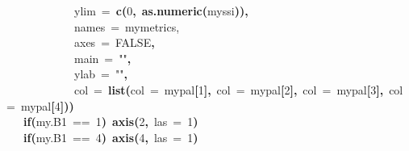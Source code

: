 \documentclass{article}
\makeatletter
\newcommand{\hlnumber}[1]{\textcolor[rgb]{0,0,0}{#1}}%
\newcommand{\hlfunctioncall}[1]{\textcolor[rgb]{0.501960784313725,0,0.329411764705882}{\textbf{#1}}}%
\newcommand{\hlstring}[1]{\textcolor[rgb]{0.6,0.6,1}{#1}}%
\newcommand{\hlkeyword}[1]{\textcolor[rgb]{0,0,0}{\textbf{#1}}}%
\newcommand{\hlargument}[1]{\textcolor[rgb]{0.690196078431373,0.250980392156863,0.0196078431372549}{#1}}%
\newcommand{\hlcomment}[1]{\textcolor[rgb]{0.180392156862745,0.6,0.341176470588235}{#1}}%
\newcommand{\hlsymbol}[1]{\textcolor[rgb]{0,0,0}{#1}}%
\newcommand{\hlstd}[1]{\textcolor[rgb]{0,0,0}{#1}}%
\newenvironment{kframe}{%
 \def\FrameCommand##1{\hskip\@totalleftmargin \hskip-\fboxsep
 \colorbox{shadecolor}{##1}\hskip-\fboxsep
     \hskip-\linewidth \hskip-\@totalleftmargin \hskip\columnwidth}%
 \MakeFramed {\advance\hsize-\width
   \@totalleftmargin\z@ \linewidth\hsize
   \@setminipage}}%
 {\par\unskip\endMakeFramed}
\newenvironment{knitrout}{}{} %
\makeatother
\begin{document}
\begin{knitrout}
\begin{kframe}
\begin{flushleft}
\hlstd{}{\ }{\ }{\ }{\ }{\ }{\ }{\ }{\ }{\ }{\ }{\ }{\ }{\ }\hlargument{ylim}{\ }\hlargument{=}{\ }\hlfunctioncall{c}\hlkeyword{(}\hlnumber{0}\hlkeyword{,}{\ }\hlfunctioncall{as.numeric}\hlkeyword{(}\hlsymbol{myssi}\hlkeyword{)}\hlkeyword{)}\hlkeyword{,}\hspace*{\fill}\\
\hlstd{}{\ }{\ }{\ }{\ }{\ }{\ }{\ }{\ }{\ }{\ }{\ }{\ }{\ }\hlcomment{\usebox{\hlnormalsizeboxhash}names{\ }={\ }mymetrics,}\hspace*{\fill}\\
\hlstd{}{\ }{\ }{\ }{\ }{\ }{\ }{\ }{\ }{\ }{\ }{\ }{\ }{\ }\hlargument{axes}{\ }\hlargument{=}{\ }\hlnumber{FALSE}\hlkeyword{,}\hspace*{\fill}\\
\hlstd{}{\ }{\ }{\ }{\ }{\ }{\ }{\ }{\ }{\ }{\ }{\ }{\ }{\ }\hlargument{main}{\ }\hlargument{=}{\ }\hlstring{"{}"{}}\hlkeyword{,}\hspace*{\fill}\\
\hlstd{}{\ }{\ }{\ }{\ }{\ }{\ }{\ }{\ }{\ }{\ }{\ }{\ }{\ }\hlargument{ylab}{\ }\hlargument{=}{\ }\hlstring{"{}"{}}\hlkeyword{,}\hspace*{\fill}\\
\hlstd{}{\ }{\ }{\ }{\ }{\ }{\ }{\ }{\ }{\ }{\ }{\ }{\ }{\ }\hlargument{col}{\ }\hlargument{=}{\ }\hlfunctioncall{list}\hlkeyword{(}\hlargument{col}{\ }\hlargument{=}{\ }\hlsymbol{mypal}\hlkeyword{[}\hlnumber{1}\hlkeyword{]}\hlkeyword{,}{\ }\hlargument{col}{\ }\hlargument{=}{\ }\hlsymbol{mypal}\hlkeyword{[}\hlnumber{2}\hlkeyword{]}\hlkeyword{,}{\ }\hlargument{col}{\ }\hlargument{=}{\ }\hlsymbol{mypal}\hlkeyword{[}\hlnumber{3}\hlkeyword{]}\hlkeyword{,}{\ }\hlargument{col}{\ }\hlargument{=}{\ }\hlsymbol{mypal}\hlkeyword{[}\hlnumber{4}\hlkeyword{]}\hlkeyword{)}\hlkeyword{)}\hspace*{\fill}\\
\hlstd{}{\ }{\ }{\ }{\ }\hlkeyword{if}\hlkeyword{(}\hlsymbol{my.B1}{\ }=={\ }\hlnumber{1}\hlkeyword{)}{\ }\hlfunctioncall{axis}\hlkeyword{(}\hlnumber{2}\hlkeyword{,}{\ }\hlargument{las}{\ }\hlargument{=}{\ }\hlnumber{1}\hlkeyword{)}\hspace*{\fill}\\
\hlstd{}{\ }{\ }{\ }{\ }\hlkeyword{if}\hlkeyword{}\hlkeyword{(}\hlsymbol{my.B1}{\ }=={\ }\hlnumber{4}\hlkeyword{)}{\ }\hlfunctioncall{axis}\hlkeyword{(}\hlnumber{4}\hlkeyword{,}{\ }\hlargument{las}{\ }\hlargument{=}{\ }\hlnumber{1}\hlkeyword{)}\hspace*{\fill}\\
\hlstd{}{\ }{\ }\hlkeyword{\usebox{\hlnormalsizeboxclosebrace}}\hspace*{\fill}\\
\hlstd{}\hlkeyword{\usebox{\hlnormalsizeboxclosebrace}}\mbox{}
\normalfont
\end{flushleft}
\end{kframe}


\end{knitrout}
\end{document}
